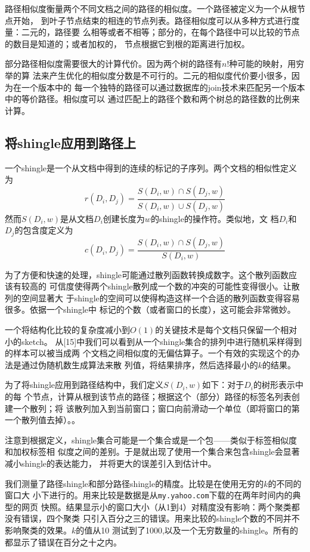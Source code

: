 路径相似度衡量两个不同文档之间的路径的相似度。一个路径被定义为一个从根节点开始，
到叶子节点结束的相连的节点列表。路径相似度可以从多种方式进行度量：二元的，路径要
么相等或者不相等；部分的，在每个路径中可以比较的节点的数目是知道的；或者加权的，
节点根据它到根的距离进行加权。

部分路径相似度需要很大的计算代价。因为两个树的路径有$n!$种可能的映射，用穷举的算
法来产生优化的相似度分数是不可行的。二元的相似度代价要小很多，因为在一个版本中的
每一个独特的路径可以通过数据库的join技术来匹配另一个版本中的等价路径。相似度可以
通过匹配上的路径个数和两个树总的路径数的比例来计算。

\subsection{将shingle应用到路径上}
一个shingle是一个从文档中得到的连续的标记的子序列。两个文档的相似性定义为
\[
r(D_i,D_j)=\frac{S(D_i,w)\cap S(D_j,w)}{S(D_i,w)\cup S(D_j,w)}
\]
然而$S(D_i,w)$是从文档$D_i$创建长度为$w$的shingle的操作符。类似地，文
档$D_i$和$D_j$的包含度定义为
\[
c(D_i,D_j)=\frac{S(D_i,w)\cap S(D_j,w)}{S(D_i,w)}
\]

为了方便和快速的处理，shingle可能通过散列函数转换成数字。这个散列函数应该有较高的
可信度使得两个shingle散列成一个数的冲突的可能性变得很小。让散列的空间显著大
于shingle的空间可以使得构造这样一个合适的散列函数变得容易很多。依据一个shingle中
标记的个数（或者窗口的长度），这可能会非常微妙。

一个将结构化比较的复杂度减小到$O(1)$的关键技术是每个文档只保留一个相对小的sketch。
从[15]中我们可以看到从一个shingle集合的排列中进行随机采样得到的样本可以被当成两
个文档之间相似度的无偏估算子。一个有效的实现这个的办法是通过伪随机数生成算法来散
列值，将结果排序，然后选择最小的$k$的结果。

为了将shingle应用到路径结构中，我们定义$S(D_i,w)$如下：对于$D_i$的树形表示中的每
个节点，计算从根到该节点的路径；根据这个（部分）路径的标签名列表创建一个散列；将
该散列加入到当前窗口；窗口向前滑动一个单位（即将窗口的第一个散列值去掉）。。

注意到根据定义，shingle集合可能是一个集合或是一个包——类似于标签相似度和加权标签相
似度之间的差别。于是就出现了使用一个集合来包含shingle会显著减小shingle的表达能力，
并将更大的误差引入到估计中。

我们测量了路径shingle和部分路径shingle的精度。比较是在使用无穷的$k$的不同的窗口大
小下进行的。用来比较是数据是从\texttt{my.yahoo.com}下载的在两年时间内的典型的网页
快照。结果显示小的窗口大小（从1到4）对精度没有影响：两个聚类都没有错误，四个聚类
只引入百分之三的错误。用来比较的shingle个数的不同并不影响聚类的效果。$k$的值从10
测试到了1000,以及一个无穷数量的shingle。所有的都显示了错误在百分之十之内。

